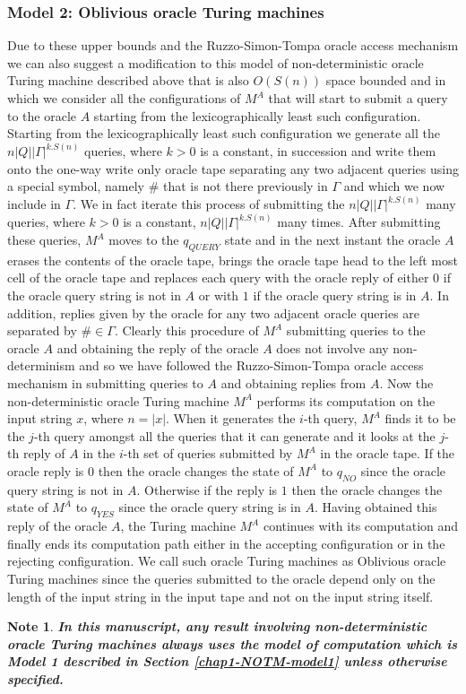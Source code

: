 \documentclass{amsbook}
\newtheorem{note}[notenum]{Note}
\theoremstyle{definition}
\theoremstyle{remark}
\numberwithin{section}{chapter}
\numberwithin{equation}{chapter}
\begin{document}
\subsubsection{Model 2: Oblivious oracle Turing machines}\label{chap1-NOTM-model2}
Due to these upper bounds and the Ruzzo-Simon-Tompa oracle access mechanism we can also suggest a modification to this model of non-deterministic oracle Turing machine described above that is also $O(S(n))$ space bounded and in which we consider all the configurations of $M^A$ that will start to submit a query to the oracle $A$ starting from the lexicographically least such configuration. Starting from the lexicographically least such configuration we generate all the $n|Q||\Gamma |^{k.S(n)}$ queries, where $k>0$ is a constant, in succession and write them onto the one-way write only oracle tape separating any two adjacent queries using a special symbol, namely $\#$ that is not there previously in $\Gamma$ and which we now include in $\Gamma$. We in fact iterate this process of submitting the $n|Q||\Gamma |^{k.S(n)}$ many queries, where $k>0$ is a constant, $n|Q||\Gamma |^{k.S(n)}$ many times. After submitting these queries, $M^A$ moves to the $q_{QUERY}$ state and in the next instant the oracle $A$ erases the contents of the oracle tape, brings the oracle tape head to the left most cell of the oracle tape and replaces each query with the oracle reply of either $0$ if the oracle query string is not in $A$ or with $1$ if the oracle query string is in $A$. In addition, replies given by the oracle for any two adjacent oracle queries are separated by $\#\in\Gamma$. Clearly this procedure of $M^A$ submitting queries to the oracle $A$ and obtaining the reply of the oracle $A$ does not involve any non-determinism and so we have followed the Ruzzo-Simon-Tompa oracle access mechanism in submitting queries to $A$ and obtaining replies from $A$. Now the non-deterministic oracle Turing machine $M^A$ performs its computation on the input string $x$, where $n=|x|$. When it generates the $i$-th query, $M^A$ finds it to be the $j$-th query amongst all the queries that it can generate and it looks at the $j$-th reply of $A$ in the $i$-th set of queries submitted by $M^A$ in the oracle tape. If the oracle reply is $0$ then the oracle changes the state of $M^A$ to $q_{NO}$ since the oracle query string is not in $A$. Otherwise if the reply is $1$ then the oracle changes the state of $M^A$ to $q_{YES}$ since the oracle query string is in $A$. Having obtained this reply of the oracle $A$, the Turing machine $M^A$ continues with its computation and finally ends its computation path either in the accepting configuration or in the rejecting configuration. We call such oracle Turing machines as Oblivious oracle Turing machines since the queries submitted to the oracle depend only on the length of the input string in the input tape and not on the input string itself.
\begin{note}
\bf{In this manuscript, any result involving non-deterministic oracle Turing machines always uses the model of computation which is Model 1 described in Section \ref{chap1-NOTM-model1} unless otherwise specified.}
\end{note}
\end{document}
